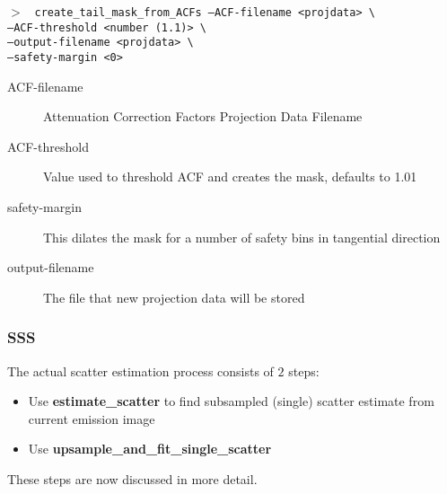 \documentclass{article}
\newcommand{\cmdline}[1]{\par \noindent $>$ \texttt{#1}\par}
\begin{document}
{{{\cmdline{%
create\_tail\_mask\_from\_ACFs		--ACF-filename <projdata> \textbackslash \\
					--ACF-threshold <number (1.1)> \textbackslash \\
					--output-filename <projdata> \textbackslash \\
					--safety-margin <0>%
}
\begin{description}
\item[ACF-filename] Attenuation Correction Factors Projection Data Filename
\item[ACF-threshold] Value used to threshold ACF and creates the mask, defaults to 1.01
\item[safety-margin] This dilates the mask for a number of safety bins in tangential direction
\item[output-filename] The file that new projection data will be stored
\end{description}

\subsubsection{SSS}
The actual scatter estimation process consists of $2$ steps:
\begin{itemize} 
\item Use \textbf{estimate\_scatter} to find subsampled (single) scatter estimate from current emission image
\item Use \textbf{upsample\_and\_fit\_single\_scatter}
\end{itemize} 
These steps are now discussed in more detail.\\[1cm]

}}}
\end{document}
